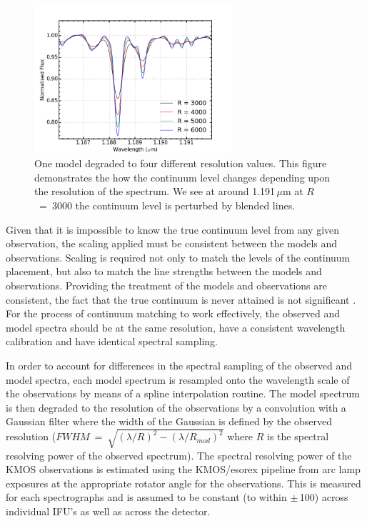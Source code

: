 \begin{figure}
 \centering
\includegraphics[width=0.65\textwidth]{JAnal/Resolution}
\caption{
One model degraded to four different resolution values.
This figure demonstrates the how the continuum level changes depending upon
the resolution of the spectrum.
We see at around 1.191\,$\mu$m at $R$~=~3000 the continuum level is perturbed by blended lines.\label{fig:mod-res}
         }
\end{figure}



Given that it is impossible to know the true continuum level from any given observation,
the scaling applied must be consistent between the models and observations.
Scaling is required not only to match the levels of the continuum placement, but also to match the line strengths between the models and observations.
Providing the treatment of the models and observations are consistent, the fact that the true continuum is never attained is not significant
\citep{2014ApJ...788...58G}.
For the process of continuum matching to work effectively,
the observed and model spectra should be at the same resolution,
have a consistent wavelength calibration
and have identical spectral sampling.

In order to account for differences in the spectral sampling of the observed and model spectra,
each model spectrum is resampled onto the wavelength scale of the observations by means of a spline interpolation routine.
The model spectrum is then degraded to the resolution of the observations by a
convolution with a Gaussian filter where the width of the Gaussian is defined by the observed resolution ($FWHM~=~\sqrt{(\lambda/R)^{2} -(\lambda/R_{mod})^{2}}$ where $R$ is the spectral resolving power of the observed spectrum).
The spectral resolving power of the KMOS observations is estimated using the KMOS/esorex pipeline from arc lamp exposures at the appropriate rotator angle for the observations.
This is measured for each spectrographs and is assumed to be constant (to within $\pm$\,100) across individual IFU's as well as across the detector.


